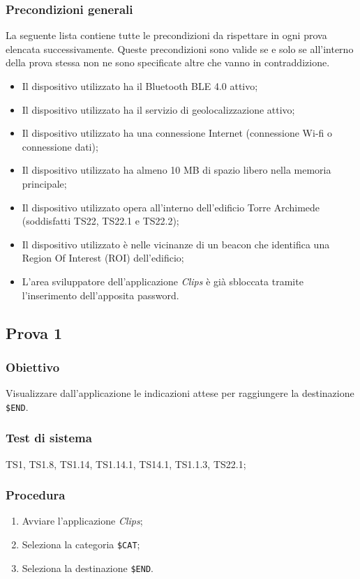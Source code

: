 \documentclass[../Sperimentazione.tex]{subfiles}
\begin{document}
\subsubsection{Precondizioni generali}
	La seguente lista contiene tutte le precondizioni da rispettare in ogni prova elencata successivamente. Queste precondizioni sono valide se e solo se all'interno della prova stessa non ne sono specificate altre che vanno in contraddizione.
	\begin{itemize}
		\item Il dispositivo utilizzato ha il Bluetooth BLE 4.0 attivo;
		\item Il dispositivo utilizzato ha il servizio di geolocalizzazione attivo;
		\item Il dispositivo utilizzato ha una connessione Internet (connessione Wi-fi o connessione dati);
		\item Il dispositivo utilizzato ha almeno 10 MB di spazio libero nella memoria principale;
		\item Il dispositivo utilizzato opera all'interno dell'edificio Torre Archimede (soddisfatti TS22, TS22.1 e TS22.2);
		\item Il dispositivo utilizzato è nelle vicinanze di un beacon che identifica una Region Of Interest (ROI) dell'edificio;
		\item L'area sviluppatore dell'applicazione \textit{Clips} è già sbloccata tramite l'inserimento dell'apposita password.
	\end{itemize}



\newpage
\subsection{Prova 1} %
\label{subsec:Prova1}	
	
	\subsubsection{Obiettivo}
		Visualizzare dall'applicazione le indicazioni attese per raggiungere la destinazione \verb|$END|.
		
	\subsubsection{Test di sistema}
		TS1, TS1.8,
		TS1.14, TS1.14.1,
		TS14.1,
		TS1.1.3,
		TS22.1;
		
	\subsubsection{Procedura}
		\begin{enumerate}
		\item Avviare l'applicazione \textit{Clips};
		\item Seleziona la categoria  \verb|$CAT|;
		\item Seleziona la destinazione  \verb|$END|.
		\end{enumerate}
	
\end{document}
